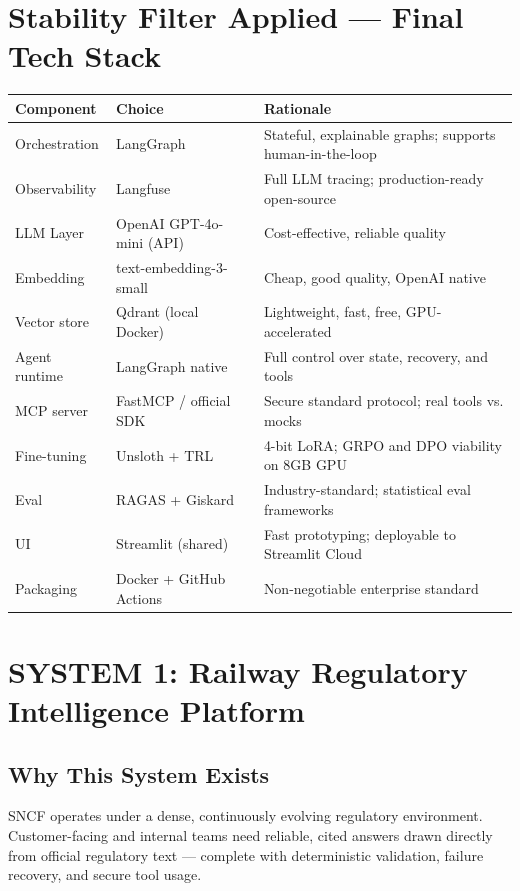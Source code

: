 \documentclass[11pt,a4paper]{article}
\begin{document}
\newpage

\section*{Stability Filter Applied — Final Tech Stack}

\vspace{0.5em}
\noindent
\begin{tabularx}{\textwidth}{@{} l l X @{}}
\toprule
\textbf{Component} & \textbf{Choice} & \textbf{Rationale} \\
\midrule
Orchestration & LangGraph & Stateful, explainable graphs; supports human-in-the-loop \\
Observability & Langfuse & Full LLM tracing; production-ready open-source \\
LLM Layer     & OpenAI GPT-4o-mini (API) & Cost-effective, reliable quality \\
Embedding     & text-embedding-3-small   & Cheap, good quality, OpenAI native \\
Vector store  & Qdrant (local Docker)    & Lightweight, fast, free, GPU-accelerated \\
Agent runtime & LangGraph native         & Full control over state, recovery, and tools \\
MCP server    & FastMCP / official SDK & Secure standard protocol; real tools vs. mocks \\
Fine-tuning   & Unsloth + TRL            & 4-bit LoRA; GRPO and DPO viability on 8GB GPU \\
Eval          & RAGAS + Giskard          & Industry-standard; statistical eval frameworks \\
UI            & Streamlit (shared)       & Fast prototyping; deployable to Streamlit Cloud \\
Packaging     & Docker + GitHub Actions  & Non-negotiable enterprise standard \\
\bottomrule
\end{tabularx}
\vspace{1em}

\newpage
\section*{SYSTEM 1: Railway Regulatory Intelligence Platform}

\subsection*{Why This System Exists}
SNCF operates under a dense, continuously evolving regulatory environment. Customer-facing and internal teams need reliable, cited answers drawn directly from official regulatory text — complete with deterministic validation, failure recovery, and secure tool usage. 
\end{document}
